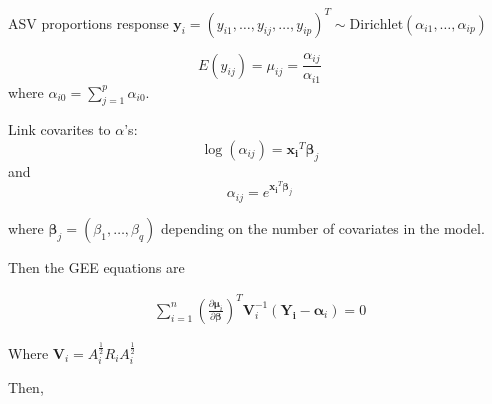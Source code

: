 \documentclass{article}
\begin{document}
ASV proportions response $\mathbf{y}_i = (y_{i1}, \ldots , y_{ij}, \ldots ,  y_{ip})^T \sim \text{Dirichlet}(\alpha_{i1}, \ldots , \alpha_{ip})$


$$E(y_{ij}) = \mu_{ij} = \frac{\alpha_{ij}}{\alpha_{i1}}$$
where $\alpha_{i0} = \sum_{j = 1}^p \alpha_{i0}$.

Link covarites to $\alpha$'s:
$$\log(\alpha_{ij}) = \mathbf{x_i}^T\boldsymbol\beta_j$$
and
$$\alpha_{ij} = e^{\mathbf{x_i}^T\boldsymbol\beta_j}$$

where $\boldsymbol\beta_j = (\beta_{1}, \ldots ,\beta_{q})$ depending on the number of covariates in the model.

Then the GEE equations are

\begin{align*}
  \sum_{i = 1}^n  \left(\frac{\partial  \boldsymbol\mu_i }{\partial \boldsymbol\beta }\right)^T\mathbf{V}_i^{-1}(\mathbf{Y_i} - \boldsymbol\alpha_i) = 0
\end{align*}

Where $\boldsymbol V_i = A_i^{\tfrac{1}{2}}R_iA_i^{\tfrac{1}{2}}$

Then,
\end{document}
